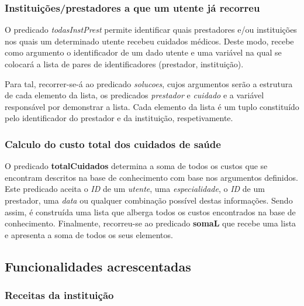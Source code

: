 \documentclass[a4paper]{article}
\begin{document}
\subsubsection{Instituições/prestadores a que um utente já recorreu}

\hspace{3mm} O predicado \textit{todasInstPrest} permite identificar quais prestadores e/ou instituições nos quais um determinado utente recebeu cuidados médicos. Deste modo, recebe como argumento o identificador de um dado utente e uma variável na qual se colocará a lista de pares de identificadores (prestador, instituição).
\par Para tal, recorrer-se-á ao predicado \textit{solucoes}, cujos argumentos serão a estrutura de cada elemento da lista, os predicados \textit{prestador} e \textit{cuidado} e a variável responsável por demonstrar a lista. Cada elemento da lista é um tuplo constituído pelo identificador do prestador e da instituição, respetivamente.

\subsubsection{Calculo do custo total dos cuidados de saúde}

\hspace{3mm} O predicado \textbf{totalCuidados} determina a soma de todos os custos que se encontram descritos na base de conhecimento com base nos argumentos definidos. Este predicado aceita o \emph{ID} de um \textit{utente}, uma \textit{especialidade}, o \emph{ID} de um prestador, uma \textit{data} ou qualquer combinação possível destas informações. Sendo assim, é construída uma lista que alberga todos os custos encontrados na base de conhecimento. Finalmente, recorreu-se ao predicado \textbf{somaL} que recebe uma lista e apresenta a soma de todos os seus elementos.

\subsection{Funcionalidades acrescentadas}

\subsubsection{Receitas da instituição}
\end{document}
